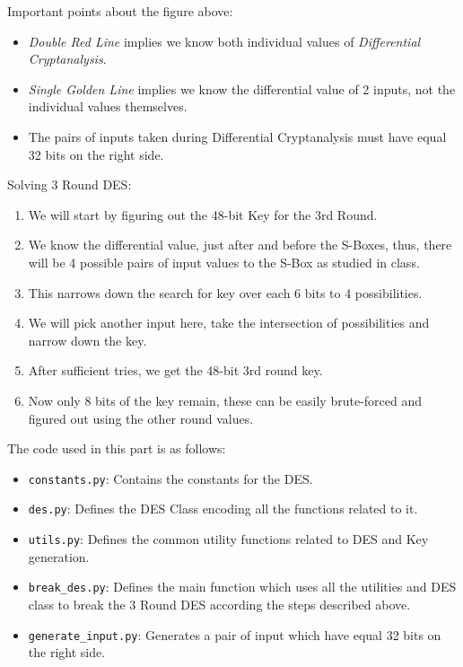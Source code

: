 \documentclass[10pt,twoside]{article}
\begin{document}
Important points about the figure above:
\begin{itemize}
  \setlength\itemsep{0em}
  \item \textit{Double Red Line} implies we know both individual values of \textit{Differential Cryptanalysis}.
  \item \textit{Single Golden Line} implies we know the differential value of 2 inputs, not the individual values themselves.
  \item The pairs of inputs taken during Differential Cryptanalysis must have equal 32 bits on the right side.
\end{itemize}

Solving 3 Round DES:
\begin{enumerate}
  \setlength\itemsep{0em}
    \item We will start by figuring out the 48-bit Key for the 3rd Round.
    \item We know the differential value, just after and before the S-Boxes, thus, there will be 4 possible pairs of input values to the S-Box as studied in class.
    \item This narrows down the search for key over each 6 bits to 4 possibilities.
    \item We will pick another input here, take the intersection of possibilities and narrow down the key.
    \item After sufficient tries, we get the 48-bit 3rd round key.
    \item Now only 8 bits of the key remain, these can be easily brute-forced and figured out using the other round values.
\end{enumerate}

The code used in this part is as follows:
\begin{itemize}
  \setlength\itemsep{0em}
  \item \texttt{constants.py}: Contains the constants for the DES.
  \item \texttt{des.py}: Defines the DES Class encoding all the functions related to it.
  \item \texttt{utils.py}: Defines the common utility functions related to DES and Key generation.
  \item \texttt{break\_des.py}: Defines the main function which uses all the utilities and DES class to break the 3 Round DES according the steps described above.
  \item \texttt{generate\_input.py}: Generates a pair of input which have equal 32 bits on the right side.
\end{itemize}
\end{document}

